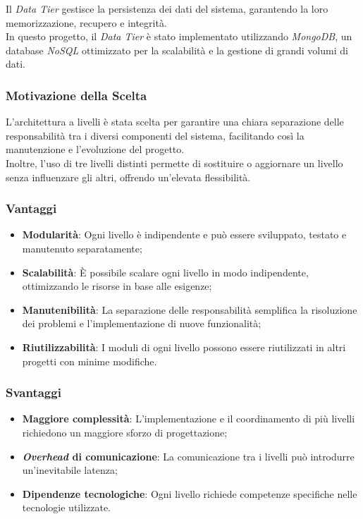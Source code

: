\noindent Il \textit{Data Tier} gestisce la persistenza dei dati del sistema, garantendo la loro memorizzazione, recupero e integrità. \\
In questo progetto, il \textit{Data Tier} è stato implementato utilizzando \textit{MongoDB}, un database \textit{NoSQL} ottimizzato per la scalabilità e la gestione di grandi volumi di dati.

\subsubsection{Motivazione della Scelta}

\noindent L'architettura a livelli è stata scelta per garantire una chiara separazione delle responsabilità tra i diversi componenti del sistema, facilitando così la manutenzione e l'evoluzione del progetto.\\
Inoltre, l'uso di tre livelli distinti permette di sostituire o aggiornare un livello senza influenzare gli altri, offrendo un'elevata flessibilità.

\pagebreak
\subsubsection{Vantaggi}
\begin{itemize}
    \item \textbf{Modularità}: Ogni livello è indipendente e può essere sviluppato, testato e manutenuto separatamente;
    \item \textbf{Scalabilità}: È possibile scalare ogni livello in modo indipendente, ottimizzando le risorse in base alle esigenze;
    \item \textbf{Manutenibilità}: La separazione delle responsabilità semplifica la risoluzione dei problemi e l'implementazione di nuove funzionalità;
    \item \textbf{Riutilizzabilità}: I moduli di ogni livello possono essere riutilizzati in altri progetti con minime modifiche.
\end{itemize}

\subsubsection{Svantaggi}
\begin{itemize}
    \item \textbf{Maggiore complessità}: L'implementazione e il coordinamento di più livelli richiedono un maggiore sforzo di progettazione;
    \item \textbf{\textit{Overhead} di comunicazione}: La comunicazione tra i livelli può introdurre un'inevitabile latenza;
    \item \textbf{Dipendenze tecnologiche}: Ogni livello richiede competenze specifiche nelle tecnologie utilizzate.
\end{itemize}

